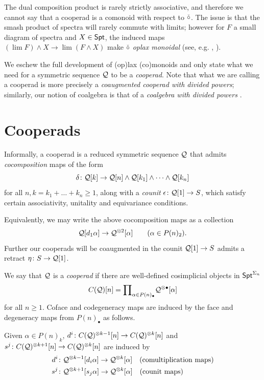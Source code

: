 \begin{remark} 
The dual composition product is rarely strictly associative, and therefore we cannot say that a cooperad is a comonoid with respect to $\check{\circ}$. The issue is that the smash product of spectra will rarely commute with limits; however for $F$ a small diagram of spectra and $X \in \mathsf{Spt}$, the induced maps  $(\lim F ) \wedge X\to \lim ( F\wedge X)$ make $\check{\circ}$ \textit{oplax monoidal} (see, e.g. \cite{Day-St}, \cite{Ching-oplax}). 

We eschew the full development of (op)lax (co)monoids and only state what we need for a symmetric sequence $\mathcal{Q}$ to be a \textit{cooperad}. Note that what we are calling a cooperad is more precisely a \textit{coaugmented cooperad with divided powers}; similarly, our notion of coalgebra is that of a \textit{coalgebra with divided powers} \cite{FG}.
\end{remark} 

\section{Cooperads} 
Informally, a cooperad is a reduced symmetric sequence $\mathcal{Q}$ that admits \textit{cocomposition} maps of the form \[ \delta \colon \mathcal{Q}[k]\to \mathcal{Q}[n] \wedge \mathcal{Q}[k_1] \wedge \cdots \wedge \mathcal{Q}[k_n] \] for all $n,k=k_1+\dots+ k_n\geq 1$, along with a \textit{counit} $\epsilon \colon \mathcal{Q}[1]\to S$, which satisfy certain associativity, unitality and equivariance conditions. 

Equivalently, we may write the above cocomposition maps as a collection \[\mathcal{Q}[d_1\alpha] \to \mathcal{Q}^{\otimes 2}[\alpha] \quad \quad (\alpha\in P(n)_2).\] Further our cooperads will be coaugmented in the counit $\mathcal{Q}[1]\to S$ admits a retract $\eta\colon S\to \mathcal{Q}[1]$. 

\begin{definition} We say that $\mathcal{Q}$ is a \textit{cooperad} if there are well-defined cosimplicial objects in $\mathsf{Spt}^{\Sigma_n}$ \[ C(\mathcal{Q})[n] = {\prod}_{\alpha\in P(n)_{\bullet}}\mathcal{Q}^{\otimes \bullet} [\alpha]\]
for all $n\geq 1$. Coface and codegeneracy maps are induced by the face and degeneracy maps from $P(n)_{\bullet}$ as follows. 

Given $\alpha\in P(n)_{k}$, $d^i \colon C(\mathcal{Q})^{\otimes k-1}[n]\to C(\mathcal{Q})^{\otimes k}[n]$ and $s^j\colon C(\mathcal{Q})^{\otimes k+1}[n]\to C(\mathcal{Q})^{\otimes k}[n]$ are induced by \begin{align*} 
    d^i &\colon \mathcal{Q}^{\otimes k-1} [d_i \alpha] \to \mathcal{Q}^{\otimes k} [\alpha] \quad (\text{comultiplication maps})
    \\
    s^j & \colon \mathcal{Q}^{\otimes k+1} [s_j \alpha] \to \mathcal{Q}^{\otimes k} [\alpha] \quad (\text{counit maps})
    \end{align*}
 
\end{definition}

